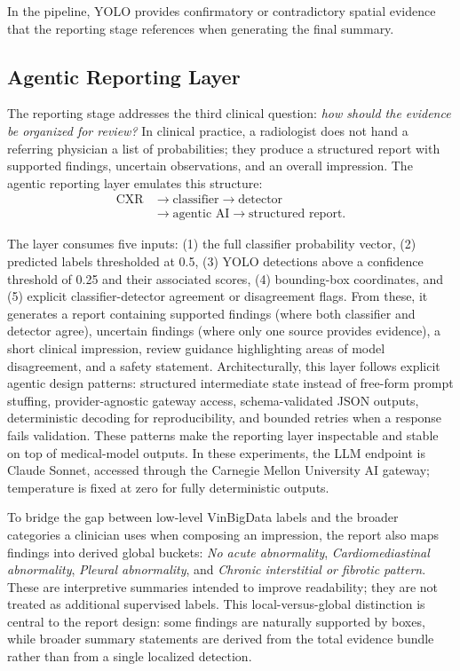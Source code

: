 \documentclass[conference]{IEEEtran}
\begin{document}
In the pipeline, YOLO provides confirmatory or contradictory spatial evidence that the reporting stage references when generating the final summary.

\subsection{Agentic Reporting Layer}
The reporting stage addresses the third clinical question: \textit{how should the evidence be organized for review?} In clinical practice, a radiologist does not hand a referring physician a list of probabilities; they produce a structured report with supported findings, uncertain observations, and an overall impression. The agentic reporting layer emulates this structure:
\begin{equation}
\begin{aligned}
\text{CXR}
&\rightarrow \text{classifier}
\rightarrow \text{detector} \\
&\rightarrow \text{agentic AI}
\rightarrow \text{structured report}.
\end{aligned}
\end{equation}

The layer consumes five inputs: (1) the full classifier probability vector, (2) predicted labels thresholded at 0.5, (3) YOLO detections above a confidence threshold of 0.25 and their associated scores, (4) bounding-box coordinates, and (5) explicit classifier-detector agreement or disagreement flags. From these, it generates a report containing supported findings (where both classifier and detector agree), uncertain findings (where only one source provides evidence), a short clinical impression, review guidance highlighting areas of model disagreement, and a safety statement. Architecturally, this layer follows explicit agentic design patterns: structured intermediate state instead of free-form prompt stuffing, provider-agnostic gateway access, schema-validated JSON outputs, deterministic decoding for reproducibility, and bounded retries when a response fails validation. These patterns make the reporting layer inspectable and stable on top of medical-model outputs. In these experiments, the LLM endpoint is Claude Sonnet, accessed through the Carnegie Mellon University AI gateway; temperature is fixed at zero for fully deterministic outputs.

To bridge the gap between low-level VinBigData labels and the broader categories a clinician uses when composing an impression, the report also maps findings into derived global buckets: \textit{No acute abnormality}, \textit{Cardiomediastinal abnormality}, \textit{Pleural abnormality}, and \textit{Chronic interstitial or fibrotic pattern}. These are interpretive summaries intended to improve readability; they are not treated as additional supervised labels. This local-versus-global distinction is central to the report design: some findings are naturally supported by boxes, while broader summary statements are derived from the total evidence bundle rather than from a single localized detection.
\end{document}
